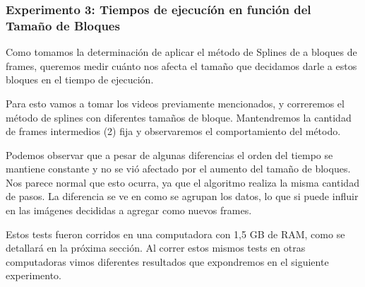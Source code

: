 \subsubsection{Experimento 3: Tiempos de ejecucí\'on en funci\'on del Tama\~no de Bloques}
\par Como tomamos la determinación de aplicar el m\'etodo de Splines de a bloques de frames, queremos medir cu\'anto nos afecta el tama\~no que decidamos darle a estos bloques en el tiempo de ejecuci\'on.
\par Para esto vamos a tomar los videos previamente mencionados, y correremos el m\'etodo de splines con diferentes tama\~nos de bloque. Mantendremos la cantidad de frames intermedios (2) fija y observaremos el comportamiento del m\'etodo.

\begin{figure}[ht]
	\begin{center}
	\end{center}
\end{figure}
\par Podemos observar que a pesar de algunas diferencias el orden del tiempo se mantiene constante y no se vi\'o afectado por el aumento del tama\~no de bloques. Nos parece normal que esto ocurra, ya que el algoritmo realiza la misma cantidad de pasos. La diferencia se ve en como se agrupan los datos, lo que si puede influir en las im\'agenes decididas a agregar como nuevos frames.
\par Estos tests fueron corridos en una computadora con 1,5 GB de RAM, como se detallar\'a en la pr\'oxima secci\'on. Al correr estos mismos tests en otras computadoras vimos diferentes resultados que expondremos en el siguiente experimento.

